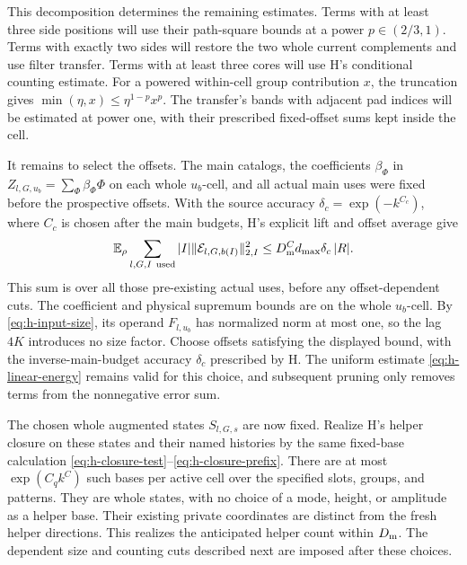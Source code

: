 This decomposition determines the remaining estimates.  Terms
with at least three side positions will use their path-square
bounds at a power \(p\in(2/3,1)\).  Terms with exactly two sides
will restore the two whole current complements and use filter
transfer.  Terms with at least three cores will use H's
conditional counting estimate.  For a powered within-cell group
contribution \(x\), the truncation gives
\(\min(\eta,x)\le\eta^{1-p}x^p\).  The transfer's bands with
adjacent pad indices will be estimated at power one, with their
prescribed fixed-offset sums kept inside the cell.

It remains to select the offsets.  The main catalogs, the
coefficients \(\beta_\Phi\) in
\(Z_{l,G,u_b}=\sum_\Phi\beta_\Phi\Phi\) on each whole \(u_b\)-cell,
and all actual main uses were fixed before the prospective
offsets.  With the source accuracy \(\delta_c=\exp(-k^{C_c})\),
where \(C_c\) is chosen after the main budgets, H's explicit lift
and offset average give
\[
 \mathbb E_\rho\sum_{l,G,I\ {\rm used}}|I|
       \|\mathcal E_{l,G,b(I)}\|_{2,I}^2
 \le D_{\rm m}^C d_{\max}\delta_c\,|R|.
\]
This sum is over all those pre-existing actual uses, before any
offset-dependent cuts.  The coefficient and physical supremum
bounds are on the whole \(u_b\)-cell.  By
\eqref{eq:h-input-size}, its operand \(F_{l,u_b}\) has normalized
norm at most one, so the lag \(4K\) introduces no size factor.
Choose offsets satisfying the displayed bound, with the
inverse-main-budget accuracy \(\delta_c\) prescribed by H.
The uniform estimate \eqref{eq:h-linear-energy} remains valid
for this choice, and subsequent pruning only removes terms from
the nonnegative error sum.

The chosen whole augmented states \(S_{l,G,s}\) are now fixed.
Realize H's helper closure on these states and their named
histories by the same fixed-base calculation
\eqref{eq:h-closure-test}--\eqref{eq:h-closure-prefix}.  There
are at most \(\exp(C_qk^C)\) such bases per active cell over the
specified slots, groups, and patterns.  They are whole states,
with no choice of a mode, height, or amplitude as a helper base.
Their existing private coordinates are distinct from the fresh
helper directions.  This realizes the anticipated helper count
within \(D_{\rm m}\).  The dependent size and counting cuts
described next are imposed after these choices.

